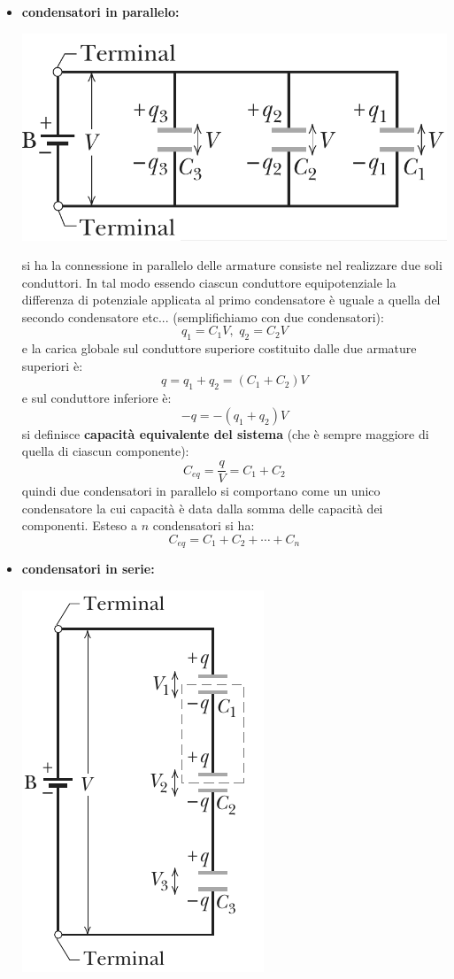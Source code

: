 \documentclass[a4paper,12pt, oneside]{book}
\begin{document}
\begin{itemize}
\item \textbf{condensatori in parallelo:}
\begin{center}
\includegraphics[scale=0.5]{img/ele4.png}
\end{center}
si ha la connessione in parallelo delle armature consiste nel realizzare due soli conduttori. In tal modo essendo ciascun conduttore equipotenziale la differenza di potenziale applicata al  primo condensatore è uguale a quella del secondo condensatore etc... (semplifichiamo con due condensatori):
$$q_1=C_1V,\,\,q_2=C_2V$$
e la carica globale sul conduttore superiore costituito dalle due armature superiori è:
$$q=q_1+q_2=(C_1+C_2)V$$
e sul conduttore inferiore è:
$$-q=-(q_1+q_2)V$$
si definisce \textbf{capacità equivalente del sistema} (che è sempre maggiore di quella di ciascun componente):
$$C_{eq}=\frac{q}{V}=C_1+C_2$$
quindi due condensatori in parallelo si comportano come un unico condensatore la cui capacità è data dalla somma delle capacità dei componenti. Esteso a $n$ condensatori si ha:
$$C_{eq}=C_1+C_2+\cdots+C_n$$
\item \textbf{condensatori in serie:}
\begin{center}
\includegraphics[scale=0.7]{img/ele5.png}

\end{center}
\end{itemize}
\end{document}
